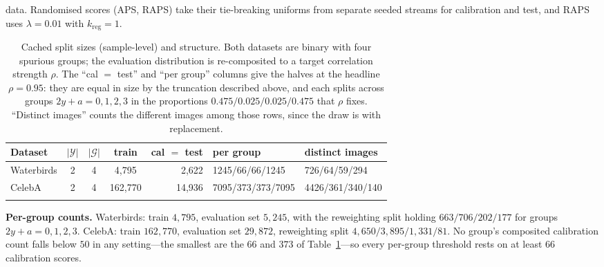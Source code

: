 \documentclass[pdflatex,sn-basic]{sn-jnl}%
\theoremstyle{thmstyleone}%
\begin{document}
\begin{appendices}
data. Randomised scores (APS, RAPS) take their tie-breaking uniforms from separate seeded streams
for calibration and test, and RAPS uses $\lambda=0.01$ with $k_{\mathrm{reg}}=1$.
\begin{table}[!ht]
\centering
\caption{Cached split sizes (sample-level) and structure. Both datasets are binary
with four spurious groups; the evaluation distribution is re-composited to a target
correlation strength $\rho$. The ``cal $=$ test'' and ``per group'' columns give the halves
at the headline $\rho=0.95$: they are equal in size by the truncation described above,
and each splits across groups $2y+a=0,1,2,3$ in the proportions
$0.475/0.025/0.025/0.475$ that $\rho$ fixes. ``Distinct images'' counts the different images
among those rows, since the draw is with replacement.}
\label{tab:data}
\small
\setlength{\tabcolsep}{4pt}
\begin{tabular}{lcccrll}
\toprule
Dataset & $|\mathcal{Y}|$ & $|\mathcal{G}|$ & train & cal $=$ test & per group & distinct images \\
\midrule
Waterbirds & 2 & 4 & 4{,}795 & 2{,}622 & 1245/66/66/1245 & 726/64/59/294 \\
CelebA & 2 & 4 & 162{,}770 & 14{,}936 & 7095/373/373/7095 & 4426/361/340/140 \\
\botrule
\end{tabular}
\end{table}
\textbf{Per-group counts.} Waterbirds: train $4{,}795$, evaluation set $5{,}245$, with
the reweighting split holding $663/706/202/177$ for groups $2y+a=0,1,2,3$. CelebA: train
$162{,}770$, evaluation set $29{,}872$, reweighting split $4{,}650/3{,}895/1{,}331/81$.
No group's composited calibration count falls below $50$ in any setting---the smallest are
the $66$ and $373$ of Table~\ref{tab:data}---so every per-group threshold rests on at least $66$
calibration scores.


\end{appendices}
\end{document}
